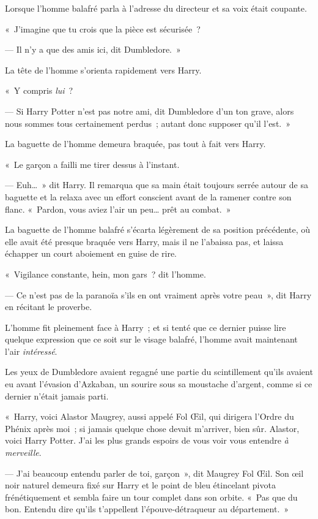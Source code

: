 Lorsque l'homme balafré parla à l'adresse du directeur et sa voix était coupante.

«~J'imagine que tu crois que la pièce est sécurisée~?

--- Il n'y a que des amis ici, dit Dumbledore.~»

La tête de l'homme s'orienta rapidement vers Harry.

«~Y compris \emph{lui}~?

--- Si Harry Potter n'est pas notre ami, dit Dumbledore d'un ton grave, alors nous sommes tous certainement perdus~; autant donc supposer qu'il l'est.~»

La baguette de l'homme demeura braquée, pas tout à fait vers Harry.

«~Le garçon a failli me tirer dessus à l'instant.

--- Euh…~» dit Harry. Il remarqua que sa main était toujours serrée autour de sa baguette et la relaxa avec un effort conscient avant de la ramener contre son flanc. «~Pardon, vous aviez l'air un peu… prêt au combat.~»

La baguette de l'homme balafré s'écarta légèrement de sa position précédente, où elle avait été presque braquée vers Harry, mais il ne l'abaissa pas, et laissa échapper un court aboiement en guise de rire.

«~Vigilance constante, hein, mon gars~? dit l'homme.

--- Ce n'est pas de la paranoïa s'ils en ont vraiment après votre peau~», dit Harry en récitant le proverbe.

L'homme fit pleinement face à Harry~; et si tenté que ce dernier puisse lire quelque expression que ce soit sur le visage balafré, l'homme avait maintenant l'air \emph{intéressé}.

Les yeux de Dumbledore avaient regagné une partie du scintillement qu'ils avaient eu avant l'évasion d'Azkaban, un sourire sous sa moustache d'argent, comme si ce dernier n'était jamais parti.

«~Harry, voici Alastor Maugrey, aussi appelé Fol Œil, qui dirigera l'Ordre du Phénix après moi~; si jamais quelque chose devait m'arriver, bien sûr. Alastor, voici Harry Potter. J'ai les plus grands espoirs de vous voir vous entendre \emph{à merveille}.

--- J'ai beaucoup entendu parler de toi, garçon~», dit Maugrey Fol Œil. Son œil noir naturel demeura fixé sur Harry et le point de bleu étincelant pivota frénétiquement et sembla faire un tour complet dans son orbite. «~Pas que du bon. Entendu dire qu'ils t'appellent l'épouve-détraqueur au département.~»

